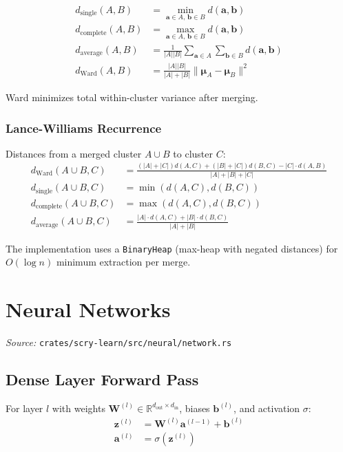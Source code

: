 \documentclass[11pt,a4paper]{article}
\theoremstyle{definition}
\theoremstyle{remark}
\begin{document}
\begin{align}
d_{\text{single}}(A, B) &= \min_{\mathbf{a} \in A,\, \mathbf{b} \in B} d(\mathbf{a}, \mathbf{b}) \\
d_{\text{complete}}(A, B) &= \max_{\mathbf{a} \in A,\, \mathbf{b} \in B} d(\mathbf{a}, \mathbf{b}) \\
d_{\text{average}}(A, B) &= \frac{1}{|A||B|}\sum_{\mathbf{a} \in A}\sum_{\mathbf{b} \in B} d(\mathbf{a}, \mathbf{b}) \\
d_{\text{Ward}}(A, B) &= \frac{|A||B|}{|A|+|B|}\|\boldsymbol{\mu}_A - \boldsymbol{\mu}_B\|^2
\end{align}

Ward minimizes total within-cluster variance after merging.

\subsubsection*{Lance-Williams Recurrence}

Distances from a merged cluster $A \cup B$ to cluster $C$:
\begin{align}
d_{\text{Ward}}(A \cup B, C) &= \frac{(|A|+|C|)d(A,C) + (|B|+|C|)d(B,C) - |C|\cdot d(A,B)}{|A|+|B|+|C|} \\
d_{\text{single}}(A \cup B, C) &= \min(d(A,C), d(B,C)) \\
d_{\text{complete}}(A \cup B, C) &= \max(d(A,C), d(B,C)) \\
d_{\text{average}}(A \cup B, C) &= \frac{|A|\cdot d(A,C) + |B|\cdot d(B,C)}{|A|+|B|}
\end{align}

The implementation uses a \texttt{BinaryHeap} (max-heap with negated distances) for $O(\log n)$ minimum extraction per merge.


\section{Neural Networks}

\noindent\textit{Source:} \texttt{crates/scry-learn/src/neural/network.rs}

\subsection{Dense Layer Forward Pass}

For layer $l$ with weights $\mathbf{W}^{(l)} \in \mathbb{R}^{d_{\mathrm{out}} \times d_{\mathrm{in}}}$, biases $\mathbf{b}^{(l)}$, and activation $\sigma$:
\begin{align}
\mathbf{z}^{(l)} &= \mathbf{W}^{(l)}\mathbf{a}^{(l-1)} + \mathbf{b}^{(l)} \\
\mathbf{a}^{(l)} &= \sigma(\mathbf{z}^{(l)})
\end{align}
\end{document}
